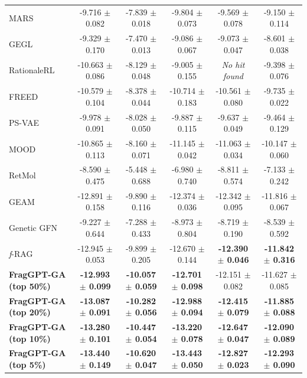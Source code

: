 \documentclass[lettersize,journal]{IEEEtran}
\begin{document}
\begin{table}[t]
\begin{tabular}{l ccccc}
        MARS\cite{xie2021marsmarkovmolecularsampling}       & -9.716 $\pm$ 0.082 & -7.839 $\pm$ 0.018 & -9.804 $\pm$ 0.073 & -9.569 $\pm$ 0.078 & -9.150 $\pm$ 0.114 \\
        GEGL\cite{ahnGuidingDeepMolecular2020}        & -9.329 $\pm$ 0.170 & -7.470 $\pm$ 0.013 & -9.086 $\pm$ 0.067 & -9.073 $\pm$ 0.047 & -8.601 $\pm$ 0.038 \\
        RationaleRL\cite{jinMultiObjectiveMoleculeGeneration2020}  & -10.663 $\pm$ 0.086 & -8.129 $\pm$ 0.048 & -9.005 $\pm$ 0.155 & \textit{No hit found} & -9.398 $\pm$ 0.076 \\
        FREED\cite{yang2021hit}      & -10.579 $\pm$ 0.104 & -8.378 $\pm$ 0.044 & -10.714 $\pm$ 0.183 & -10.561 $\pm$ 0.080 & -9.735 $\pm$ 0.022 \\
        PS-VAE\cite{kong2022molecule}     & -9.978 $\pm$ 0.091 & -8.028 $\pm$ 0.050 & -9.887 $\pm$ 0.115 & -9.637 $\pm$ 0.049 & -9.464 $\pm$ 0.129 \\
        MOOD\cite{lee2023exploring}       & -10.865 $\pm$ 0.113 & -8.160 $\pm$ 0.071 & -11.145 $\pm$ 0.042 & -11.063 $\pm$ 0.034 & -10.147 $\pm$ 0.060 \\
        RetMol\cite{wang2022retrieval}     & -8.590 $\pm$ 0.475 & -5.448 $\pm$ 0.688 & -6.980 $\pm$ 0.740 & -8.811 $\pm$ 0.574 & -7.133 $\pm$ 0.242 \\
        GEAM\cite{lee2023drug}       & -12.891 $\pm$ 0.158 & -9.890 $\pm$ 0.116 & -12.374 $\pm$ 0.036 & -12.342 $\pm$ 0.095 & -11.816 $\pm$ 0.067 \\
        Genetic GFN\cite{kim2024genetic}  & -9.227 $\pm$ 0.644 & -7.288 $\pm$ 0.433 & -8.973 $\pm$ 0.804 & -8.719 $\pm$ 0.190 & -8.539 $\pm$ 0.592 \\
        \textit{f}-RAG\cite{lee2024molecule}  & -12.945 $\pm$ 0.053 & -9.899 $\pm$ 0.205 & -12.670 $\pm$ 0.144 & \textbf{-12.390 $\pm$ 0.046} & \textbf{-11.842 $\pm$ 0.316} \\
        \hline        
        \textbf{FragGPT-GA (top 50\%)} & \textbf{-12.993 $\pm$ 0.099} & \textbf{-10.057 $\pm$ 0.059} & \textbf{-12.701 $\pm$ 0.098} & -12.151 $\pm$ 0.082 & -11.627 $\pm$ 0.085\\
        \textbf{FragGPT-GA (top 20\%)} & \textbf{-13.087 $\pm$ 0.091} & \textbf{-10.282 $\pm$ 0.056} & \textbf{-12.988 $\pm$ 0.094} & \textbf{-12.415 $\pm$ 0.079} & \textbf{-11.885 $\pm$ 0.088} \\
        \textbf{FragGPT-GA (top 10\%)} & \textbf{-13.280 $\pm$ 0.101} & \textbf{-10.447 $\pm$ 0.054} & \textbf{-13.220 $\pm$ 0.078} & \textbf{-12.647 $\pm$ 0.047} & \textbf{-12.090 $\pm$ 0.089} \\
        \textbf{FragGPT-GA (top 5\%)} & \textbf{-13.440 $\pm$ 0.149} & \textbf{-10.620 $\pm$ 0.047} & \textbf{-13.443 $\pm$ 0.050} & \textbf{-12.827 $\pm$ 0.023} & \textbf{-12.293 $\pm$ 0.090} \\
        \hline
    \end{tabular}
\end{table}
\end{document}
